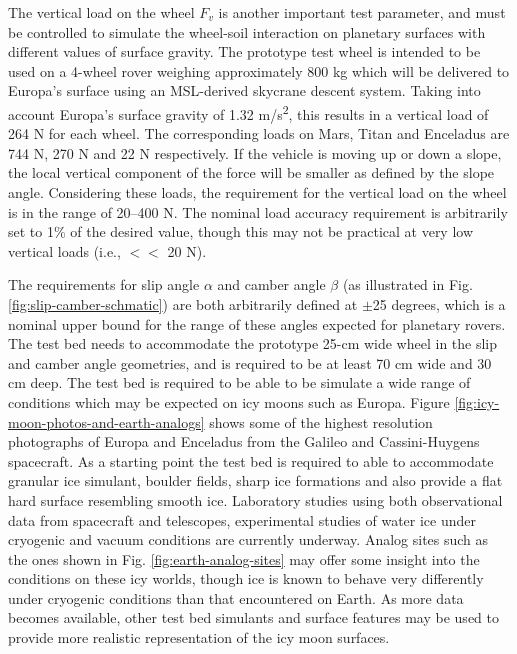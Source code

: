 \documentclass{article}
\begin{document}
The vertical load on the wheel $F_v$ is another important test parameter, and must be controlled to simulate the wheel-soil interaction on planetary surfaces with different values of surface gravity. The prototype test wheel is intended to be used on a 4-wheel rover weighing approximately 800 kg which will be delivered to Europa's surface using an MSL-derived skycrane descent system. Taking into account Europa's surface gravity of 1.32 m/s\textsuperscript{2}, this results in a vertical load of 264 N for each wheel. The corresponding loads on Mars, Titan and Enceladus are 744 N, 270 N and 22 N respectively. If the vehicle is moving up or down a slope, the local vertical component of the force will be smaller as defined by the slope angle.  Considering these loads, the requirement for the vertical load on the wheel is in the range of 20--400 N. The nominal  load accuracy requirement is arbitrarily set to 1\% of the desired value, though this may not be practical at very low vertical loads (i.e., $<<$ 20 N). 

The requirements for slip angle $\alpha$ and camber angle $\beta$ (as illustrated in Fig. \ref{fig:slip-camber-schmatic}) are both arbitrarily defined at $\pm$25 degrees, which is a nominal upper bound for the range of these angles expected for planetary rovers. The test bed needs to accommodate the prototype 25-cm wide wheel in the slip and camber angle geometries, and is required to be at least 70 cm wide and 30 cm deep. The test bed is required to be able to be simulate a wide range of conditions which may be expected on icy moons such as Europa. Figure \ref{fig:icy-moon-photos-and-earth-analogs} shows some of the highest resolution photographs of Europa and Enceladus from the Galileo and Cassini-Huygens spacecraft. As a starting point the test bed is required to able to accommodate granular ice simulant, boulder fields, sharp ice formations and also provide a flat hard surface resembling smooth ice. Laboratory studies using both observational data from spacecraft and telescopes, experimental studies of water ice under cryogenic and  vacuum conditions are currently underway. Analog sites such as the ones shown in Fig. \ref{fig:earth-analog-sites} may offer some insight into the conditions on these icy worlds, though ice is known to behave very differently under cryogenic conditions than that encountered on Earth.  As more data becomes available, other test bed simulants and surface features may be used to provide more realistic representation of the icy moon surfaces. 
\end{document}
